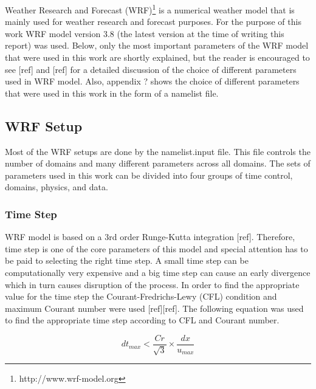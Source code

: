 \documentclass[a4paper,12pt]{article}
\numberwithin{equation}{section} %
\begin{document}
Weather Research and Forecast (WRF)\footnote{http://www.wrf-model.org} is a numerical weather model that is mainly used for weather research and forecast purposes.
For the purpose of this work WRF model version 3.8 (the latest version at the time of writing this report) was used. Below, only the most important parameters of the WRF model that were used in this work are shortly explained, but the reader is encouraged to see [ref] and [ref] for a detailed discussion of the choice of different parameters used in WRF model. Also, appendix ? shows the choice of different parameters that were used in this work in the form of a namelist file. 



\subsection{WRF Setup}

Most of the WRF setups are done by the namelist.input file. This file controls the number of domains and many different parameters across all domains. The sets of parameters used in this work can be divided into four groups of time control, domains, physics, and data.

\subsubsection{Time Step}

WRF model is based on a 3rd order Runge-Kutta integration [ref]. Therefore, time step is one of the core parameters of this model and special attention has to be paid to selecting the right time step. A small time step can be computationally very expensive and a big time step can cause an early divergence which in turn causes disruption of the process. In order to find the appropriate value for the time step the Courant-Fredrichs-Lewy (CFL) condition and maximum Courant number were used [ref][ref]. The following equation was used to find the appropriate time step according to CFL and Courant number.

\vspace{0.25cm}
\begin{equation}
dt_{max} < \frac{Cr}{\sqrt{3}} \times \frac{dx}{u_{max}}
\end{equation}
\end{document}
